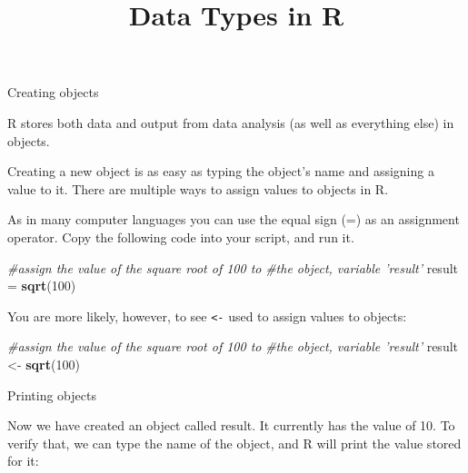 \documentclass[ignorenonframetext,]{beamer}
\title{Data Types in R}
\date{}
\newenvironment{Shaded}{\begin{snugshade}}{\end{snugshade}}
\newcommand{\KeywordTok}[1]{\textcolor[rgb]{0.13,0.29,0.53}{\textbf{#1}}}
\newcommand{\DecValTok}[1]{\textcolor[rgb]{0.00,0.00,0.81}{#1}}
\newcommand{\StringTok}[1]{\textcolor[rgb]{0.31,0.60,0.02}{#1}}
\newcommand{\CommentTok}[1]{\textcolor[rgb]{0.56,0.35,0.01}{\textit{#1}}}
\newcommand{\NormalTok}[1]{#1}
\begin{document}
\frame{\titlepage}

\begin{frame}

\begin{block}{Creating objects}

R stores both data and output from data analysis (as well as everything
else) in objects.

\end{block}

\end{frame}

\begin{frame}[fragile]

Creating a new object is as easy as typing the object's name and
assigning a value to it. There are multiple ways to assign values to
objects in R.

As in many computer languages you can use the equal sign (=) as an
assignment operator. Copy the following code into your script, and run
it.

\begin{Shaded}
\begin{Highlighting}[]
\CommentTok{#assign the value of the square root of 100 to }
\CommentTok{#the object, variable 'result'}
\NormalTok{result =}\StringTok{ }\KeywordTok{sqrt}\NormalTok{(}\DecValTok{100}\NormalTok{)}
\end{Highlighting}
\end{Shaded}

\end{frame}

\begin{frame}[fragile]

You are more likely, however, to see \texttt{\textless{}-} used to
assign values to objects:

\begin{Shaded}
\begin{Highlighting}[]
\CommentTok{#assign the value of the square root of 100 to}
\CommentTok{#the object, variable 'result'}
\NormalTok{result <-}\StringTok{ }\KeywordTok{sqrt}\NormalTok{(}\DecValTok{100}\NormalTok{)}
\end{Highlighting}
\end{Shaded}

\end{frame}

\begin{frame}

\begin{block}{Printing objects}

Now we have created an object called result. It currently has the value
of 10. To verify that, we can type the name of the object, and R will
print the value stored for it:

\end{block}

\end{frame}
\end{document}
